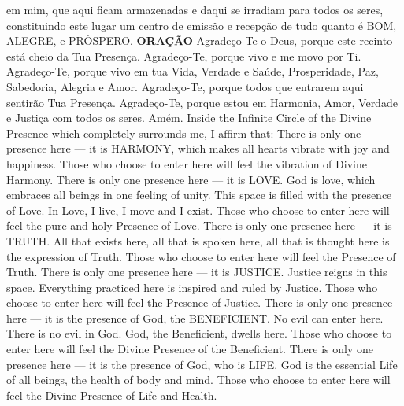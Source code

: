     em mim, que aqui ficam armazenadas e daqui se
    irradiam para todos os seres, constituindo este
    lugar um centro de emissão e recepção de tudo
    quanto é BOM, ALEGRE, e PRÓSPERO.
    \preceparspace
    \textbf{ORAÇÃO}
    \preceparspace
    Agradeço-Te o Deus, porque este recinto está cheio
    da Tua Presença.
    \preceparspace
    Agradeço-Te, porque vivo e me movo por Ti.
    \preceparspace
    Agradeço-Te, porque vivo em tua Vida, Verdade e
    Saúde, Prosperidade, Paz, Sabedoria, Alegria e Amor.
    \preceparspace
    Agradeço-Te, porque todos que entrarem aqui sentirão
    Tua Presença.
    \preceparspace
    Agradeço-Te, porque estou em Harmonia, Amor, Verdade
    e Justiça com todos os seres.
    \preceparspace
    Amém.
  \endverse
  \beginverse\color{englishcolor}
    \preceparspace
    Inside the Infinite Circle of the Divine Presence
    which completely surrounds me, I affirm that:
    \preceparspace
    There is only one presence here --- it is HARMONY,
    which makes all hearts vibrate with joy and happiness.
    Those who choose to enter here will feel the vibration
    of Divine Harmony.
    \preceparspace
    There is only one presence here --- it is LOVE.
    God is love, which embraces all beings in one
    feeling of unity. This space is filled with the
    presence of Love. In Love, I live, I move and I
    exist. Those who choose to enter here will feel
    the pure and holy Presence of Love.
    \preceparspace
    There is only one presence here --- it is TRUTH.
    All that exists here, all that is spoken here,
    all that is thought here is the expression of
    Truth. Those who choose to enter here will feel
    the Presence of Truth.
    \preceparspace
    There is only one presence here --- it is JUSTICE.
    Justice reigns in this space. Everything practiced
    here is inspired and ruled by Justice. Those who
    choose to enter here will feel the Presence of
    Justice.
    \preceparspace
    There is only one presence here --- it is the
    presence of God, the BENEFICIENT. No evil can enter
    here. There is no evil in God. God, the Beneficient,
    dwells here. Those who choose to enter here will
    feel the Divine Presence of the Beneficient.
    \preceparspace
    There is only one presence here --- it is the
    presence of God, who is LIFE. God is the essential
    Life of all beings, the health of body and mind.
    Those who choose to enter here will feel the Divine
    Presence of Life and Health.

